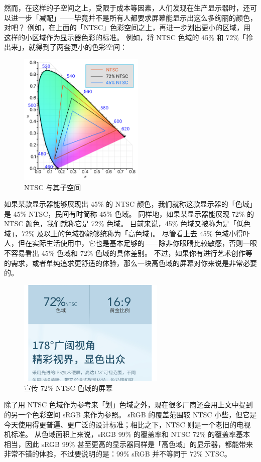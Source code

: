 然而，在这样的子空间之上，受限于成本等因素，人们发现在生产显示器时，还可以进一步「减配」——毕竟并不是所有人都要求屏幕能显示出这么多绚丽的颜色，对吧？
例如，在上面的「NTSC」色彩空间之上，再进一步划出更小的区域，用这样的小区域作为显示器色彩的标准。
例如，将 NTSC 色域的 45\% 和 72\%「拎出来」，就得到了两套更小的色彩空间：

\begin{figure}[htb!]
  \centering
  \includegraphics[width=6cm]{assets/NTSC_72_45.png}
  \caption{NTSC 与其子空间}
  \label{NTSC_72_45}
\end{figure}

如果某款显示器能够展现出 45\% 的 NTSC 颜色，我们就称这款显示器的「色域」是 45\% NTSC，民间有时简称 45\% 色域。
同样地，如果某显示器能展现 72\% 的 NTSC 颜色，我们就称它是 72\% 色域。
目前来说，45\% 色域又被称为是「低色域」，72\% 及以上的色域都能够统称为「高色域」。
尽管看上去 45\% 色域小得吓人，但在实际生活使用中，它也是基本足够的——除非你眼睛比较敏感，否则一眼不容易看出 45\% 色域和 72\% 色域的具体差别。
不过，如果你有进行艺术创作等的需求，或者单纯追求更舒适的体验，那么一块高色域的屏幕对你来说是非常必要的。

\begin{figure}[htb!]
  \centering
  \includegraphics[width=7cm]{assets/72_NTSC_Ad.png}
  \caption{宣传 72\% NTSC 色域的屏幕}
  \label{72_NTSC_Ad}
\end{figure}

除了用 NTSC 色域作为参考来「划」色域之外，现在很多厂商还会用上文中提到的另一个色彩空间 sRGB 来作为参照。
sRGB 的覆盖范围较 NTSC 小些，但它是今天使用得更普遍、更广泛的设计标准；相比之下，NTSC 则是一个老旧的电视机标准。
从色域面积上来说，sRGB 99\% 的覆盖率和 NTSC 72\% 的覆盖率基本相当，因此 sRGB 99\% 甚至更高的显示器同样是「高色域」的显示器，都能带来非常不错的体验，不过要说明的是：99\% sRGB 并不等同于 72\% NTSC。

